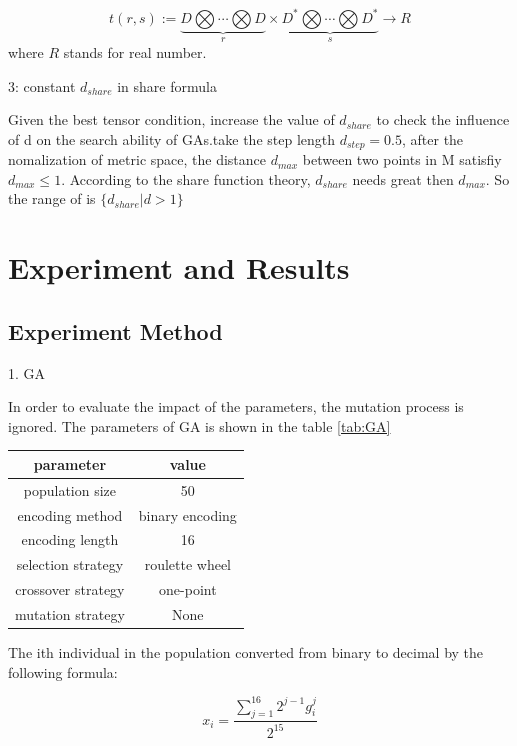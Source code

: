 \documentclass[smallextended]{svjour3}       %
\begin{document}
\begin{multicols}{2}
\begin{equation}
t(r,s):= \underbrace{D \bigotimes \cdots \bigotimes D}_{r} \times \underbrace{D^{\ast} \bigotimes 
\cdots \bigotimes D^{\ast}}_{s} \rightarrow R
\end{equation}
where $R$ stands for real number.

3: constant $d_{share}$ in share formula


Given the best tensor condition, increase the value of $d_{share}$ to check the influence of d on the 
search ability of GAs.take the step length $d_{step}=0.5$, after the nomalization of metric space, the
distance $d_{max}$ between two points in M satisfiy $d_{max}\leq 1$. According to the share function 
theory, $d_{share}$ needs great then $d_{max}$. So the range of is $\{d_{share}|d > 1\}$

 


\section{Experiment and Results}

\subsection{Experiment Method}
1. GA

In order to evaluate the impact of the parameters, the mutation process is ignored. The parameters
of GA is shown in the table \ref{tab:GA}

\begin{center}
\begin{tabular}{cc}
	\toprule
	parameter & value \\
	\midrule
	population size      & 50 \\
    encoding method      & binary encoding\\
    encoding length      & 16 \\
	selection strategy   & roulette wheel  \\
	crossover strategy   & one-point \\
	mutation strategy    & None \\
	\bottomrule
\end{tabular}
\label{tab:GA}
\end{center}


The ith individual in the population converted  from binary to decimal by the following formula:

\begin{equation}
x_i=\frac{\sum_{j=1}^{16}2^{j-1}g_i^j}{2^{15}}
\end{equation}



\end{multicols}
\end{document}
